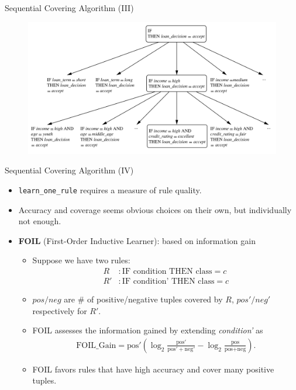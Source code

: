 \begin{frame}{Sequential Covering Algorithm (III)}
	\vspace*{-1em}
	\begin{figure}[h]
		\centering
		\includegraphics[height=0.8\textheight]{img/7-classification_rule_space.png}
	\end{figure}
\end{frame}

\begin{frame}{Sequential Covering Algorithm (IV)}
	\begin{itemize}
		\item \texttt{learn\_one\_rule} requires a measure of rule quality.
		\item Accuracy and coverage seems obvious choices on their own, but
		      individually not enough.
		\item \textbf{FOIL} (First-Order Inductive Learner): based on information gain
		      \begin{itemize}
			      \item Suppose we have two rules:
			            \begin{align*}
				            \label{}
				            R  & : \text{IF condition THEN class} = c  \\
				            R' & : \text{IF condition' THEN class} = c
			            \end{align*}
			      \item $pos/neg$ are $\#$ of positive/negative tuples covered by $R$, $pos'/neg'$ respectively for $R'$.
			      \item FOIL assesses the information gained by extending \textit{condition'} as
			            \begin{align*}
				            \text{FOIL\_Gain} = \text{pos}' \left( \log_2 \frac{\text{pos}'}{\text{pos}' + \text{neg}'} - \log_2 \frac{\text{pos}}{\text{pos}+\text{neg}} \right).
			            \end{align*}
			      \item FOIL favors rules that have high accuracy and cover many positive tuples.
		      \end{itemize}
	\end{itemize}
\end{frame}

